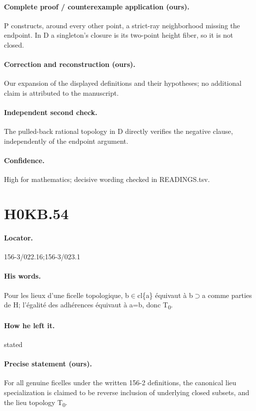 \paragraph{Complete proof / counterexample application (ours).} P constructs, around every other point, a strict-ray neighborhood missing the endpoint. In D a singleton’s closure is its two-point height fiber, so it is not closed.

\paragraph{Correction and reconstruction (ours).} Our expansion of the displayed definitions and their hypotheses; no additional claim is attributed to the manuscript.

\paragraph{Independent second check.} The pulled-back rational topology in D directly verifies the negative clause, independently of the endpoint argument.

\paragraph{Confidence.} High for mathematics; decisive wording checked in READINGS.tsv.

\section*{H0KB.54}\label{statement:H0KB.54}
\paragraph{Locator.} 156-3/022.16;156-3/023.1

\paragraph{His words.} Pour les lieux d’une ficelle topologique, b\ensuremath{\in}cl\{a\} équivaut à b\ensuremath{\supset}a comme parties de H; l’égalité des adhérences équivaut à a=b, donc T\textsubscript{0}.

\paragraph{How he left it.} stated

\paragraph{Precise statement (ours).} For all genuine ficelles under the written 156-2 definitions, the canonical lieu specialization is claimed to be reverse inclusion of underlying closed subsets, and the lieu topology T\textsubscript{0}.

